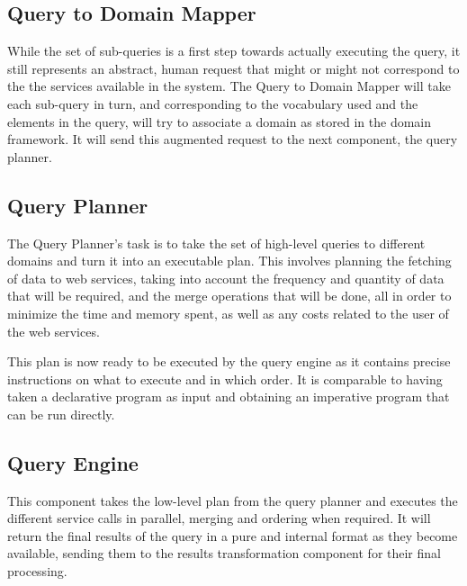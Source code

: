 
\subsection{Query to Domain Mapper} %
\label{sub:query_to_domain_mapper}

While the set of sub-queries is a first step towards actually executing the query, it still represents an abstract, human request that might or might not correspond to the the services available in the system. The Query to Domain Mapper will take each sub-query in turn, and corresponding to the vocabulary used and the elements in the query, will try to associate a domain as stored in the domain framework. It will send this augmented request to the next component, the query planner.


\subsection{Query Planner} %
\label{sub:query_planner}

The Query Planner's task is to take the set of high-level queries to different domains and turn it into an executable plan. This involves planning the fetching of data to web services, taking into account the frequency and quantity of data that will be required, and the merge operations that will be done, all in order to minimize the time and memory spent, as well as any costs related to the user of the web services.

This plan is now ready to be executed by the query engine as it contains precise instructions on what to execute and in which order. It is comparable to having taken a declarative program as input and obtaining an imperative program that can be run directly.


\subsection{Query Engine} %
\label{sub:query_engine}
This component takes the low-level plan from the query planner and executes the different service calls in parallel, merging and ordering when required. It will return the final results of the query in a pure and internal format as they become available, sending them to the results transformation component for their final processing.

